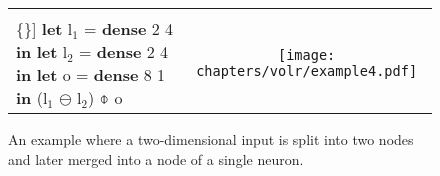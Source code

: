 \begin{figure}
  \begin{tabular}[t]{l c}
    \begin{minipage}{0.45\textwidth}
      \begin{Verbatim}[mathescape,commandchars=\\\{\}]
\textbf{let} l$_1$ = \textbf{dense} 2 4 \textbf{in}
\textbf{let} l$_2$ = \textbf{dense} 2 4 \textbf{in}
\textbf{let} o = \textbf{dense} 8 1 \textbf{in} 
  (l$_1$ $\ominus$ l$_2$) $\obar$ o
      \end{Verbatim}
    \end{minipage} & \begin{minipage}{0.5\textwidth}
       \texttt{[image: chapters/volr/example4.pdf]}
    \end{minipage}
  \end{tabular}
   \caption{An example where a two-dimensional input is split into
     two nodes and later merged into a node of a single neuron.}
  \label{fig:volr-examples}
\end{figure}

